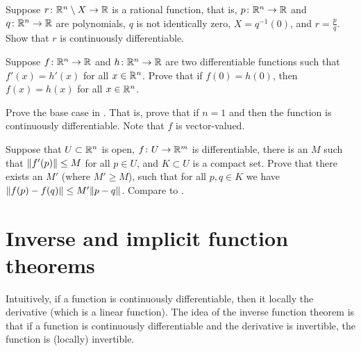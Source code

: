 \begin{exercise}
Suppose $r \colon {\mathbb{R}}^n \setminus X \to {\mathbb{R}}$ is a rational function, that is,
$p \colon {\mathbb{R}}^n \to {\mathbb{R}}$ and
$q \colon {\mathbb{R}}^n \to {\mathbb{R}}$ are polynomials,
$q$ is not identically zero,
$X = q^{-1}(0)$, and
$r = \frac{p}{q}$.
Show that $r$ is continuously differentiable.
\end{exercise}

\begin{exercise}
Suppose $f \colon {\mathbb{R}}^n \to {\mathbb{R}}$ and $h \colon {\mathbb{R}}^n \to {\mathbb{R}}$ are two 
differentiable functions such that $f'(x) = h'(x)$ for all $x \in {\mathbb{R}}^n$.
Prove that
if $f(0) = h(0)$, then $f(x) = h(x)$ for all $x \in {\mathbb{R}}^n$.
\end{exercise}

\begin{exercise}
Prove the base case
in .  That is, prove that
if $n=1$ and 
 then the function is continuously
differentiable.  Note that $f$ is vector-valued.
\end{exercise}

\begin{exercise}
Suppose that $U \subset {\mathbb{R}}^n$ is open, $f \colon U \to {\mathbb{R}}^m$ is
differentiable, there is an $M$ such that $\lVert {f'(p)} \rVert \leq M$
for all $p \in U$, and $K \subset U$ is a compact set.  Prove that
there exists an $M'$ (where $M' \geq M$), such that
for all $p,q \in K$ we have $\lVert {f(p)-f(q)} \rVert \leq M' \lVert {p-q} \rVert$.
Compare to .
\end{exercise}



\sectionnewpage
\section{Inverse and implicit function theorems}
\label{sec:svinvfuncthm}



Intuitively, if a function is continuously differentiable, then it
locally  the derivative (which is a linear function).
The idea of the inverse function theorem is that if a function is
continuously differentiable and the derivative is invertible, the function is
(locally) invertible.


